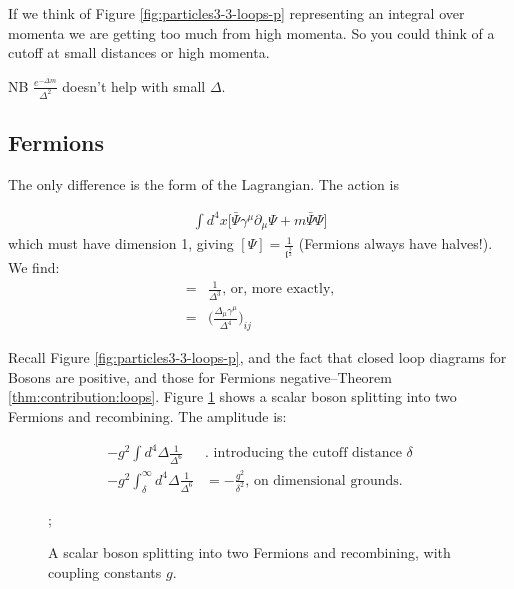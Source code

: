 \documentclass[]{article}
\begin{document}
If we think of Figure \ref{fig:particles3-3-loops-p} representing an integral over momenta we are getting too much from high momenta. So you could think of a cutoff at small distances or high momenta.

NB $\frac{e^{- \Delta m}}{\Delta^2}$ doesn't help with small $\Delta$.

\subsection{Fermions}

The only difference is the form of the Lagrangian. The action is

\begin{align*}
	\int d^4x \big[\bar{\Psi} \gamma^\mu \partial_\mu \Psi + m \bar{\Psi} \Psi\big]
\end{align*}
which must have dimension 1, giving $[\Psi]=\frac{1}{\mathfrak{l}^\frac{3}{2}}$ (Fermions always have halves!). We find:
\begin{align*}
	[\braket{0|\Psi^\dagger_i(x)\Psi_j(y)|0}]=&\frac{1}{\Delta^3} \text{, or, more exactly,}\\
	=& \big(\frac{\Delta_\mu \gamma^\mu}{\Delta^4}\big)_{ij}
\end{align*}

Recall Figure \ref{fig:particles3-3-loops-p}, and the fact that closed loop diagrams for Bosons are positive, and those for Fermions negative--Theorem \ref{thm:contribution:loops}. Figure \ref{fig:fermion:loop} shows a scalar boson splitting into two Fermions and recombining. The amplitude is:

\begin{align*}
	- g^2 \int d^4 \Delta \frac{1}{\Delta^6}& \text{. introducing the cutoff distance $\delta$}\\
	- g^2 \int_\delta^\infty d^4 \Delta \frac{1}{\Delta^6}&=-\frac{g^2}{\delta^2} \text{, on dimensional grounds.} 
\end{align*}

\begin{figure}[H]
	\begin{center}
		\caption[A scalar boson splitting into two Fermions and recombining]{A scalar boson splitting into two Fermions and recombining, with coupling constants $g$.}\label{fig:fermion:loop}
		;
	\end{center}
\end{figure}
\end{document}
